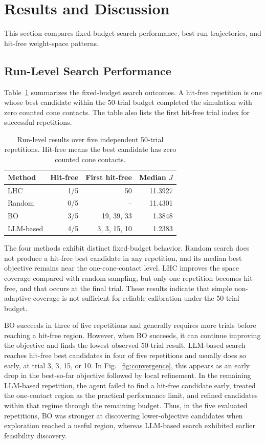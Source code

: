 \documentclass[10pt,twocolumn]{ICCAS}
\begin{document}
\section{Results and Discussion}
\label{sec:results}

This section compares fixed-budget search performance, best-run trajectories,
and hit-free weight-space patterns.

\subsection{Run-Level Search Performance}
\label{subsec:run_level_results}

Table~\ref{tab:method_summary} summarizes the fixed-budget search outcomes. A
hit-free repetition is one whose best candidate within the 50-trial budget
completed the simulation with zero counted cone contacts. The table also
lists the first hit-free trial index for successful repetitions.

\begin{table}[t]
\caption{Run-level results over five independent 50-trial repetitions. Hit-free means the best candidate has zero counted cone contacts.}
\label{tab:method_summary}
\centering
\begin{tabular}{lrrr}
\hline
Method & Hit-free & First hit-free & Median $J$ \\
\hline
LHC & 1/5 & 50 & 11.3927 \\
Random & 0/5 & -- & 11.4301 \\
BO & 3/5 & 19, 39, 33 & 1.3848 \\
LLM-based & 4/5 & 3, 3, 15, 10 & 1.2383 \\
\hline
\end{tabular}
\end{table}


The four methods exhibit distinct fixed-budget behavior. Random search does not
produce a hit-free best candidate in any repetition, and its median best
objective remains near the one-cone-contact level. LHC improves the space
coverage compared with random sampling, but only one repetition becomes hit-free,
and that occurs at the final trial. These results indicate that simple
non-adaptive coverage is not sufficient for reliable calibration under the
50-trial budget.

BO succeeds in three of five repetitions and generally requires more trials
before reaching a hit-free region. However, when BO succeeds, it can continue
improving the objective and finds the lowest observed 50-trial result.
LLM-based search reaches hit-free best candidates in four of five repetitions
and usually does so early, at trial 3, 3, 15, or 10. In
Fig.~\ref{fig:convergence}, this appears as an early drop in the best-so-far
objective followed by local refinement. In the remaining LLM-based repetition,
the agent failed to find a hit-free candidate early, treated the one-contact
region as the practical performance limit, and refined candidates within that
regime through the remaining budget.
Thus, in the five evaluated repetitions, BO was stronger at
discovering lower-objective candidates when exploration reached a useful
region, whereas LLM-based search exhibited earlier feasibility discovery.
\end{document}
